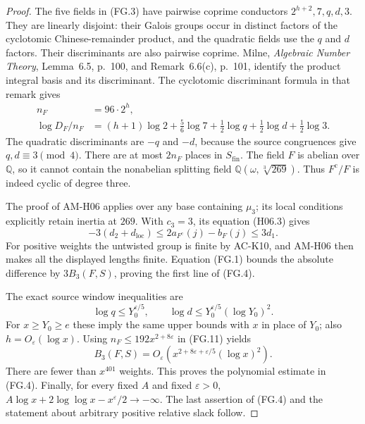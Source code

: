 \begin{proof}
The five fields in (FG.3) have pairwise coprime
conductors $2^{h+2},7,q,d,3$.
They are linearly disjoint: their Galois groups occur
in distinct factors of the cyclotomic Chinese-remainder
product, and the quadratic fields use the $q$ and $d$
factors.  Their discriminants are also pairwise coprime.
Milne, \emph{Algebraic Number Theory}, Lemma~6.5,
p.~100, and Remark~6.6(c), p.~101, identify the product
integral basis and its discriminant.  The cyclotomic
discriminant formula in that remark gives
\[
 \begin{split}
 n_F&=96\cdot2^h,\\
 \log D_F/n_F&=(h+1)\log2+\tfrac56\log7
                 +\tfrac12\log q+\tfrac12\log d
                 +\tfrac12\log3.
 \end{split}
 \tag{FG.11}
\]
The quadratic discriminants are $-q$ and $-d$, because
the source congruences give $q,d\equiv3\pmod4$.
There are at most $2n_F$ places in $S_{\mathrm{fin}}$.
The field $F$ is abelian over $\mathbb Q$, so it cannot
contain the nonabelian splitting field
$\mathbb Q(\omega,\sqrt[3]{269})$.
Thus $F^{\mathrm c}/F$ is indeed cyclic of degree three.

The proof of AM-H06 applies over any base containing
$\mu_3$; its local conditions explicitly retain inertia
at $269$.  With $c_3=3$, its equation (H06.3) gives
\[
 -3(d_2+d_{\mathrm{loc}})
 \leq2a_{F^{\mathrm c}}(j)-b_F(j)\leq3d_1.
\]
For positive weights the untwisted group is finite by
AC-K10, and AM-H06 then makes all the displayed lengths
finite.  Equation (FG.1) bounds the absolute difference
by $3B_3(F,S)$, proving the first line of (FG.4).

The exact source window inequalities are
\[
 \log q\leq Y_0^{\varepsilon/5},\qquad
 \log d\leq Y_0^{\varepsilon/5}(\log Y_0)^2.
\]
For $x\geq Y_0\geq e$ these imply the same upper bounds
with $x$ in place of $Y_0$; also $h=O_\varepsilon(\log x)$.
Using $n_F\leq192x^{2+8\varepsilon}$ in (FG.11) yields
\[
 B_3(F,S)=O_\varepsilon\!\left(
 x^{2+8\varepsilon+\varepsilon/5}(\log x)^2\right).
\]
There are fewer than $x^{401}$ weights.
This proves the polynomial estimate in (FG.4).
Finally, for every fixed $A$ and fixed $\varepsilon>0$,
$A\log x+2\log\log x-x^\varepsilon/2\to-\infty$.
The last assertion of (FG.4) and the statement about
arbitrary positive relative slack follow.
\end{proof}

